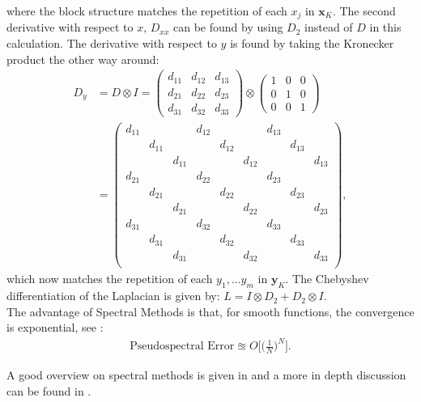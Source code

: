 \documentclass[11pt, a4paper]{article}
\theoremstyle{definition}
\begin{document}
where the block structure matches the repetition of each $x_j$ in $\mathbf{x}_K$.
The second derivative with respect to $x$, $D_{xx}$ can be found by using $D_2$ instead of $D$ in this calculation. 
The derivative with respect to $y$ is found by taking the Kronecker product the other way around:
\begin{align*}
	D_y&=D \otimes I = 
	\begin{pmatrix}
		d_{11} & d_{12} & d_{13}\\
		d_{21} & d_{22} & d_{23} \\
		d_{31} & d_{32} & d_{33}
	\end{pmatrix}
	\otimes
	\begin{pmatrix}
		1 & 0 & 0\\
		0 & 1 & 0 \\
		0 & 0 & 1
	\end{pmatrix}
	\\&=
	\begin{pmatrix}
		d_{11} & & & d_{12} & & & d_{13} & & \\
		& d_{11} & & & d_{12} & & &  d_{13} & \\
		& & d_{11} & & &  d_{12} &  & & d_{13}\\
		d_{21} & & & d_{22} & & & d_{23} & & \\
		& d_{21} & & & d_{22} & & &  d_{23} & \\
		& & d_{21} & & &  d_{22} &  & & d_{23}\\
		d_{31} & & & d_{32} & & & d_{33} & & \\
		& d_{31} & & & d_{32} & & &  d_{33} & \\
		& & d_{31} & & &  d_{32} &  & & d_{33}\\
	\end{pmatrix},
\end{align*}
which now matches the repetition of each $y_1,...y_m$ in $\mathbf{y}_K$.
The Chebyshev differentiation of the Laplacian is given by: $L=I  \otimes D_2 + D_2 \otimes I$.
\\










The advantage of Spectral Methods is that, for smooth functions, the convergence is exponential, see \cite{Boyd1}:
\begin{align*}
	\text{Pseudospectral Error} \approxeq O \bigg[ \bigg( \frac{1}{N} \bigg)^N \bigg].
\end{align*}


A good overview on spectral methods is given in \cite{bibTrefethen} and a more in depth discussion can be found in \cite{Boyd1}.
	
	
	\pagebreak	
	
	
	
\end{document}

